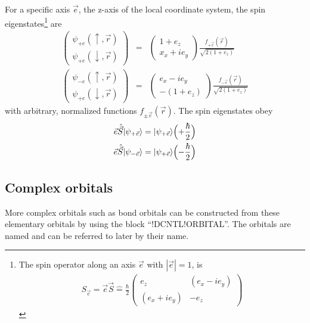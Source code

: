\documentclass[final,12pt]{article}
\begin{document}
{{{{{{For a specific axis $\vec{e}$, the z-axis of the local coordinate
system, the spin eigenstates\footnote{The spin operator along an axis
  $\vec{e}$ with $|\vec{e}|=1$, is
\begin{eqnarray}
S_{\vec{e}}
=\vec{e}\vec{S}
\hat{=}\frac{\hbar}{2}\left(\begin{array}{cc}
e_z & (e_x-ie_y)\\(e_x+ie_y)& -e_z\end{array}\right)
\end{eqnarray}}
 are
\begin{eqnarray}
\left(\begin{array}{c}
\psi_{+e}(\uparrow,\vec{r})\\\psi_{+e}(\downarrow,\vec{r})
\end{array}\right)
&=&
\left(\begin{array}{c}
1+e_z\\x_x+ie_y
\end{array}\right)\frac{f_{+\vec{e}}(\vec{r})}{\sqrt{2(1+e_z)}}
%
\nonumber\\
%
\left(\begin{array}{c}
\psi_{-e}(\uparrow,\vec{r})\\\psi_{+e}(\downarrow,\vec{r})
\end{array}\right)
&=&
\left(\begin{array}{c}
e_x-ie_y\\-(1+e_z)
\end{array}\right)\frac{f_{-\vec{e}}(\vec{r})}{\sqrt{2(1+e_z)}}
\end{eqnarray}
with arbitrary, normalized functions $f_{\pm\vec{e}}(\vec{r})$.
The spin eigenstates obey
\begin{eqnarray}
\vec{e}\hat{\vec{S}}|\psi_{+\vec{e}}\rangle=|\psi_{+\vec{e}}\rangle
\Bigl(+\frac{\hbar}{2}\Bigr)
\nonumber\\
\vec{e}\hat{\vec{S}}|\psi_{-\vec{e}}\rangle=|\psi_{+\vec{e}}\rangle
\Bigl(-\frac{\hbar}{2}\Bigr)
\end{eqnarray}







\subsection{Complex orbitals}
More complex orbitals such as bond orbitals can be constructed from
these elementary orbitals by using the block ``!DCNTL!ORBITAL''. The
orbitals are named and can be referred to later by their name.

}}}}}}
\end{document}
